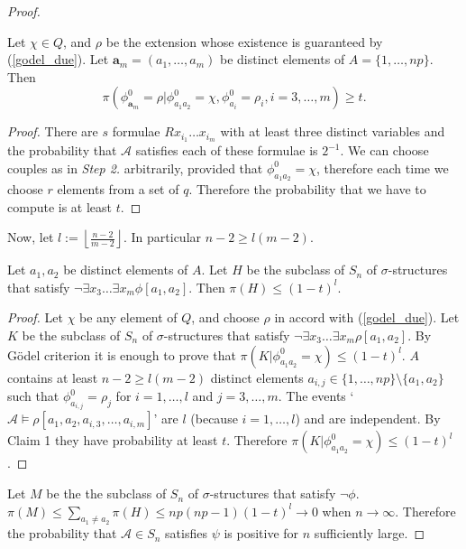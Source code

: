 \begin{thm}
\begin{proof}
\setcounter{claim}{0}
\begin{claim} Let $\chi \in Q$, and $\rho$ be the extension whose existence is guaranteed by (\ref{godel_due}). 
Let $\mathbf{a}_m=(a_1, \ldots, a_m)$ be distinct elements of $A=\{1, \ldots, np\}$. 
Then $$\pi(\phi^0 _{\mathbf{a}_m}=\rho|\phi^0 _{a_1 a_2}=\chi , \phi^0 _{a_i} =\rho_i ,i=3, \ldots, m) \ge t \text{.}$$ 
\begin{proof} 
There are $s$ formulae $Rx_{i_1} \ldots x_{i_m}$ with at least three distinct variables and the probability that $\mathcal{A}$ satisfies each of these formulae is $2^{-1}$. 
We can choose couples as in \emph{Step 2.} arbitrarily, provided that $\phi^0 _{a_1 a_2}=\chi$, therefore each time we choose $r$ elements from a set of $q$.  
Therefore the probability that we have to compute is at least $t$.
\end{proof}
\end{claim}
Now, let $l:=\left \lfloor{\frac{n-2}{m-2}}\right \rfloor$. 
In particular $n -2\ge l(m-2)$.  
\begin{claim} 
Let $a_1, a_2$ be distinct elements of $A$. Let $H$ be the subclass of $S_n$ of $\sigma$-structures that satisfy $\lnot \exists x_3 \ldots \exists x_m \phi [a_1, a_2] $. 
Then $\pi(H) \le (1-t)^l$.  
\begin{proof} Let $\chi $ be any element of $Q$, and choose $\rho$ in accord with (\ref{godel_due}). 
Let $K$ be the subclass of $S_n$ of $\sigma$-structures that satisfy $\lnot \exists x_3 \ldots \exists x_m \rho [a_1, a_2] $. 
By G\"odel criterion it is enough to prove that $\pi(K|\phi^0 _{a_1 a_2} =\chi)\le (1-t)^l$. $A$ contains at least $n-2 \ge l(m-2)$ distinct elements $a_{i,j} \in \{1, \ldots, np\} \setminus \{a_1, a_2\} $ such that $\phi^0 _{a_{i,j}} =\rho_j$ for $i=1, \ldots, l$ and $j=3, \ldots, m$. 
The events `$\mathcal{A} \models \rho[a_1, a_2, a_{i,3}, \ldots, a_{i,m}]$' are $l$ (because $i=1, \ldots, l$) and are independent. 
By Claim 1 they have probability at least $t$. 
Therefore $\pi(K|\phi^0 _{a_1 a_2} =\chi)\le (1-t)^l$. 
\end{proof} 
\end{claim}
Let $M$ be the the subclass of $S_n$ of $\sigma$-structures that satisfy $\lnot \phi$. 
$\pi(M)\le \sum_{a_1 \neq a_2} \pi(H) \le np (np-1)(1-t)^{l}  \to 0$ when $n \to \infty$. 
Therefore the probability that $\mathcal{A} \in S_n$ satisfies $\psi$ is positive for $n$ sufficiently large. 
\end{proof}
\end{thm} 

